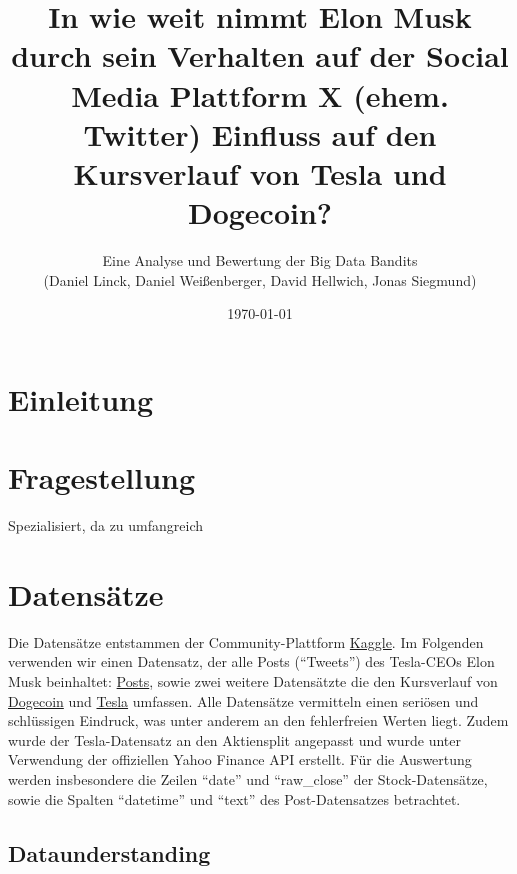 \documentclass{article}
\title{\textbf {In wie weit nimmt Elon Musk durch sein Verhalten auf der Social Media Plattform X (ehem. Twitter) Einfluss auf den Kursverlauf von Tesla und Dogecoin?}}
\author{Eine Analyse und Bewertung der Big Data Bandits \\ (Daniel Linck, Daniel Weißenberger, David Hellwich, Jonas Siegmund)}
\date{\today}
\begin{document}
\maketitle

\tableofcontents

\section{Einleitung}


\newpage

\section{Fragestellung}
Spezialisiert, da zu umfangreich



\section{Datensätze}
Die Datensätze entstammen der Community-Plattform \href{https://www.kaggle.com/datasets/dhruvildave/dogecoin-historical-data}{Kaggle}.
Im Folgenden verwenden wir einen Datensatz, der alle Posts (``Tweets'') des Tesla-CEOs Elon Musk  beinhaltet: \href{https://www.kaggle.com/datasets/aryansingh0909/elon-musk-tweets-updated-daily}{Posts}, sowie zwei weitere Datensätzte die den Kursverlauf von \href{https://www.kaggle.com/datasets/dhruvildave/dogecoin-historical-datay}{Dogecoin} und \href{https://www.kaggle.com/datasets/dhruvildave/dogecoin-historical-datay}{Tesla} umfassen.
Alle Datensätze vermitteln einen seriösen und schlüssigen Eindruck, was unter anderem an den fehlerfreien Werten liegt.
Zudem wurde der Tesla-Datensatz an den Aktiensplit angepasst und wurde unter Verwendung der offiziellen Yahoo Finance API erstellt.
Für die Auswertung werden insbesondere die Zeilen ``date'' und ``raw\_close'' der Stock-Datensätze, sowie die Spalten ``datetime'' und ``text'' des Post-Datensatzes betrachtet.

\subsection{Dataunderstanding}
\end{document}
